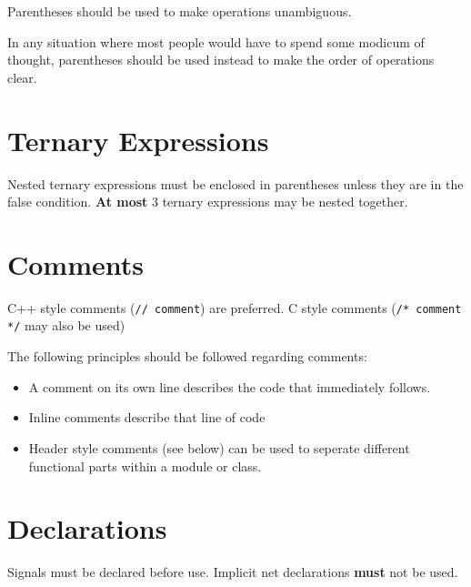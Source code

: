    \begin{keybox}
      Parentheses should be used to make operations unambiguous.
    \end{keybox}

    In any situation where most people would have to spend some modicum of thought, parentheses should be used instead to make the order of operations clear.

  \section{Ternary Expressions}
  \label{systemverilog_conventions:ternary_expressions}

    \begin{keybox}
      Nested ternary expressions must be enclosed in parentheses unless they are in the false condition.
      \textbf{At most} 3 ternary expressions may be nested together.
    \end{keybox}


  \section{Comments}
  \label{systemverilog_conventions:comments}

    \begin{keybox}
      C++ style comments (\lstinline{// comment}) are preferred.
      C style comments (\lstinline{/* comment */} may also be used)
    \end{keybox}

    The following principles should be followed regarding comments:
    \begin{itemize}
      \item A comment on its own line describes the code that immediately follows.
      \item Inline comments describe that line of code
      \item Header style comments (see below) can be used to seperate different functional parts within a module or class.
    \end{itemize}

    \begin{goodbox}
      
    \end{goodbox}

  \section{Declarations}
  \label{systemverilog_conventions:declarations}

    \begin{keybox}
      Signals must be declared before use.
      Implicit net declarations \textbf{must} not be used.
    \end{keybox}
